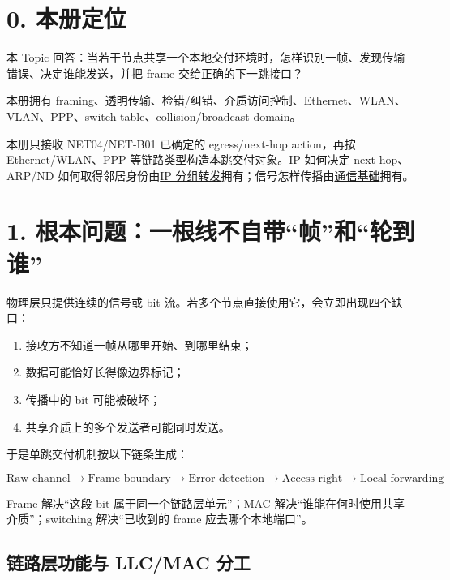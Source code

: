 \documentclass[UTF8,fontset=none,11pt,a4paper]{ctexart}
\providecommand{\tightlist}{\setlength{\itemsep}{0pt}\setlength{\parskip}{0pt}}
\begin{document}
\section{0. 本册定位}\label{0-ux672cux518cux5b9aux4f4d}

本 Topic
回答：当若干节点共享一个本地交付环境时，怎样识别一帧、发现传输错误、决定谁能发送，并把
frame 交给正确的下一跳接口？

本册拥有 framing、透明传输、检错/纠错、介质访问控制、Ethernet、WLAN、VLAN、PPP、switch table、collision/broadcast domain。

本册只接收 NET04/NET-B01 已确定的 egress/next-hop action，再按 Ethernet/WLAN、PPP 等链路类型构造本跳交付对象。IP 如何决定 next hop、ARP/ND 如何取得邻居身份由\href{../04_IP地址_子网与分组转发/README.md}{IP 分组转发}拥有；信号怎样传播由\href{../01_通信基础与网络性能/README.md}{通信基础}拥有。

\section{1.
根本问题：一根线不自带``帧''和``轮到谁''}\label{1-ux6839ux672cux95eeux9898ux4e00ux6839ux7ebfux4e0dux81eaux5e26ux5e27ux548cux8f6eux5230ux8c01}

物理层只提供连续的信号或 bit
流。若多个节点直接使用它，会立即出现四个缺口：

\begin{enumerate}
\def\labelenumi{\arabic{enumi}.}
\tightlist
\item
  接收方不知道一帧从哪里开始、到哪里结束；
\item
  数据可能恰好长得像边界标记；
\item
  传播中的 bit 可能被破坏；
\item
  共享介质上的多个发送者可能同时发送。
\end{enumerate}

于是单跳交付机制按以下链条生成：

\[
\boxed{
\text{Raw channel}
\to \text{Frame boundary}
\to \text{Error detection}
\to \text{Access right}
\to \text{Local forwarding}
}
\]

Frame 解决``这段 bit 属于同一个链路层单元''；MAC
解决``谁能在何时使用共享介质''；switching 解决``已收到的 frame
应去哪个本地端口''。

\subsection{链路层功能与 LLC/MAC 分工}
\end{document}
